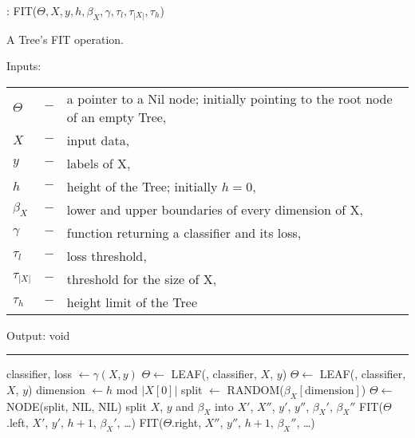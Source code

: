 \begin{algorithm}
  \caption{: FIT($\Theta, X, y, h, \beta_X, \gamma,
    \tau_{l}, \tau_{|X|}, \tau_{h}$)}%
  \label{alg:fit}
  A Tree's FIT operation.

  Inputs:

    \begin{tabu}{llX}
    $\Theta$ &$-$ &a pointer to a Nil node; initially
      pointing to the root node of an empty Tree,\\
    $X$ &$-$ &input data,\\
    $y$ &$-$ &labels of X,\\
    $h$ &$-$ &height of the Tree; initially $h = 0$,\\
    $\beta_X$ &$-$ &lower and upper boundaries of every
      dimension of X,\\
    $\gamma$ &$-$ &function returning a classifier and its
      loss,\\
    $\tau_{l}$ &$-$ &loss threshold,\\
    $\tau_{|X|}$ &$-$ &threshold for the size of X,\\
    $\tau_{h}$ &$-$ &height limit of the Tree
    \end{tabu}

  Output: void

  \noindent\rule{\linewidth}{0.4pt}

  \begin{algorithmic}[1]
    \STATE classifier, loss $\leftarrow \gamma(X, y)$
      \STATE $\Theta \leftarrow$ LEAF(\TRUE, classifier,
         $X$, $y$)
      \STATE $\Theta \leftarrow$ LEAF(\FALSE, classifier,
        $X$, $y$)
    \ELSE
      \STATE dimension $\leftarrow h$ mod $|X[0]|$
      \STATE split $\leftarrow$ RANDOM($\beta_X[
        \text{dimension}]$)
      \STATE $\Theta \leftarrow$ NODE(split, NIL, NIL)
      \STATE split $X$, $y$ and $\beta_X$ into
        $X'$, $X''$, $y'$, $y''$, $\beta_X'$, $\beta_X''$
      \STATE FIT($\Theta$.left, $X'$, $y'$, $h + 1$,
        $\beta_X'$, \dots)
      \STATE FIT($\Theta$.right, $X''$, $y''$, $h + 1$,
        $\beta_X''$, \dots)
    \ENDIF
  \end{algorithmic}
\end{algorithm}

